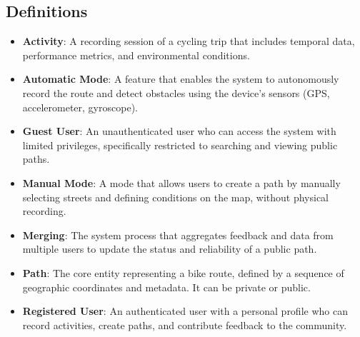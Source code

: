 \subsection{Definitions}
\begin{itemize}
    \item \textbf{Activity}: A recording session of a cycling trip that includes temporal data, performance metrics, and environmental conditions.
    \item \textbf{Automatic Mode}: A feature that enables the system to autonomously record the route and detect obstacles using the device's sensors (GPS, accelerometer, gyroscope).
    \item \textbf{Guest User}: An unauthenticated user who can access the system with limited privileges, specifically restricted to searching and viewing public paths.
    \item \textbf{Manual Mode}: A mode that allows users to create a path by manually selecting streets and defining conditions on the map, without physical recording.
    \item \textbf{Merging}: The system process that aggregates feedback and data from multiple users to update the status and reliability of a public path.
    \item \textbf{Path}: The core entity representing a bike route, defined by a sequence of geographic coordinates and metadata. It can be private or public.
    \item \textbf{Registered User}: An authenticated user with a personal profile who can record activities, create paths, and contribute feedback to the community.
\end{itemize}

